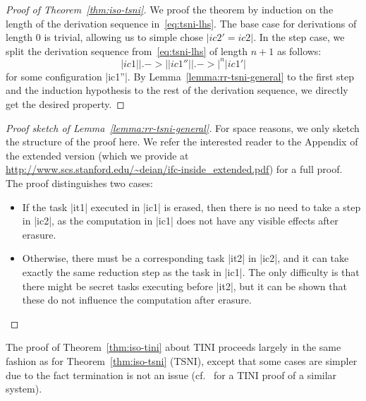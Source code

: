 \begin{proof}[Proof of Theorem~\ref{thm:iso-tsni}]
  We proof the theorem by induction on the length of the derivation sequence in~\eqref{eq:tsni-lhs}.
  The base case for derivations
  of length 0 is trivial, allowing
  us to simple chose $|ic2'=ic2|$.  In the step case,
  we split the derivation sequence from~\eqref{eq:tsni-lhs} of length $n+1$ as follows:
  \[
  |ic1| |.->| |ic1''| |.->|^n |ic1'|
  \]
  for some configuration |ic1''|.  By Lemma~\ref{lemma:rr-tsni-general} to
  the first step and
  the induction hypothesis to the rest of the derivation sequence,
  we directly get the desired property.
\end{proof}
\begin{proof}[Proof sketch of Lemma~\ref{lemma:rr-tsni-general}]
  For space reasons, we only sketch the structure of the proof here.
  We refer the interested reader to the Appendix
  \ifextended
  \else
  of the extended version (which we provide at
  \url{http://www.scs.stanford.edu/~deian/ifc-inside_extended.pdf})
  \fi
  for a full proof.
  The proof distinguishes two cases:
  \begin{itemize}
    \item If the task |it1| executed in |ic1| is erased, then there is no
    need to take a step in |ic2|, as the computation in |ic1| does
    not have any visible effects after erasure.
    \item Otherwise, there must be a corresponding task |it2| in |ic2|, and
    it can take exactly the same reduction step as the task in |ic1|.
    The only difficulty is that there might be secret tasks executing
    before |it2|, but it can be shown that these do not influence the
    computation after erasure.
  \end{itemize}
\end{proof}
The proof of Theorem~\ref{thm:iso-tini} about TINI proceeds largely
in the same fashion as for Theorem~\ref{thm:iso-tsni} (TSNI), except that
some cases are simpler due to the fact termination is not an issue
(cf.~\cite{lio} for a TINI proof of a similar system).

